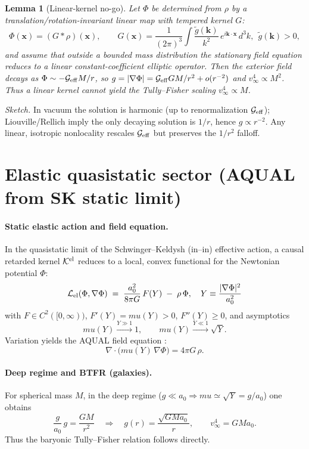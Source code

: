 \documentclass[aps,prd,onecolumn,superscriptaddress,nofootinbib]{revtex4-2}
\def\boxed#1{#1}%
\def\mu{mu}%
\providecommand{\be}{\begin{equation}}
\providecommand{\ee}{\end{equation}}
\newtheorem{lemma}{Lemma}
\begin{document}
\begin{lemma}[Linear-kernel no-go]\label{lem:nogo}
Let \(\Phi\) be determined from \(\rho\) by a translation/rotation-invariant \emph{linear} map with tempered kernel \(G\):
\[
\Phi(\mathbf{x})=(G * \rho)(\mathbf{x}),\qquad  
G(\mathbf{x})=\frac{1}{(2\pi)^3}\!\int \frac{\tilde g(\mathbf{k})}{k^2}\,e^{i\mathbf{k}\cdot\mathbf{x}}\,d^3k,\ \ \tilde g(\mathbf{k})>0,
\]
and assume that outside a bounded mass distribution the stationary field equation reduces to a linear constant-coefficient elliptic operator. Then the exterior field decays as \(\Phi\sim -\mathcal G_{\rm eff} M/r\), so \(g=|\nabla\Phi|=\mathcal G_{\rm eff}GM/r^2+o(r^{-2})\) and \(v_\infty^4\propto M^2\). Thus a linear kernel \emph{cannot} yield the Tully–Fisher scaling \(v_\infty^4\propto M\).
\end{lemma}

\noindent\emph{Sketch.} In vacuum the solution is harmonic (up to renormalization \(\mathcal G_{\rm eff}\)); Liouville/Rellich imply the only decaying solution is \(1/r\), hence \(g\propto r^{-2}\). Any linear, isotropic nonlocality rescales \(\mathcal G_{\rm eff}\) but preserves the \(1/r^2\) falloff.

\section{Elastic quasistatic sector (AQUAL from SK static limit)}
\label{sec:elastic}

\paragraph{Static elastic action and field equation.}
In the quasistatic limit of the Schwinger–Keldysh (in–in) effective action, a causal retarded kernel \(\mathcal K^{\rm el}\) reduces to a local, convex functional for the Newtonian potential \(\Phi\):
\[
\boxed{\ \mathcal L_{\rm el}(\Phi,\nabla\Phi) \;=\; \frac{a_0^2}{8\pi G}\,F\!\left(Y\right)\;-\;\rho\,\Phi,\quad Y\equiv \frac{|\nabla\Phi|^2}{a_0^2}\ }
\]
with \(F\in C^2([0,\infty))\), \(F'(Y)=\mu(Y)>0\), \(F''(Y)\ge0\), and asymptotics
\[
\mu(Y)\xrightarrow{Y\gg1} 1,\qquad \mu(Y)\xrightarrow{Y\ll1} \sqrt{Y}.
\]
Variation yields the AQUAL field equation \cite{BekensteinMilgrom1984}:
\be
\nabla\!\cdot\!\big(\mu(Y)\,\nabla\Phi\big)=4\pi G\,\rho.
\ee

\paragraph{Deep regime and BTFR (galaxies).}
For spherical mass \(M\), in the deep regime (\(g\ll a_0\Rightarrow \mu\simeq\sqrt{Y}=g/a_0\)) one obtains
\[
\frac{g}{a_0}\,g=\frac{GM}{r^2}\quad\Rightarrow\quad g(r)=\frac{\sqrt{GMa_0}}{r},\qquad v_\infty^4=GMa_0.
\]
Thus the baryonic Tully–Fisher relation follows directly.
\end{document}
